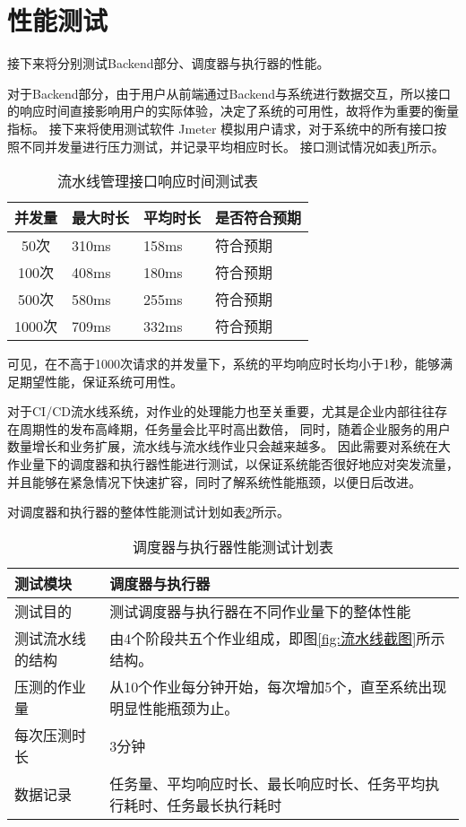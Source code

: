 \section{性能测试}
接下来将分别测试Backend部分、调度器与执行器的性能。

对于Backend部分，由于用户从前端通过Backend与系统进行数据交互，所以接口的响应时间直接影响用户的实际体验，决定了系统的可用性，故将作为重要的衡量指标。
接下来将使用测试软件 Jmeter 模拟用户请求，对于系统中的所有接口按照不同并发量进行压力测试，并记录平均相应时长。
接口测试情况如表\ref{tab:流水线管理接口响应时间测试表}所示。

\begin{table}[h]
  \centering
  \caption{流水线管理接口响应时间测试表}
  \label{tab:流水线管理接口响应时间测试表}
  \begin{tabular}{clll}
    \toprule
    并发量         & 最大时长            & 平均时长     & 是否符合预期                       \\
    \midrule
    50次         & 310ms              & 158ms     & 符合预期                 \\
    100次        & 408ms              & 180ms     & 符合预期                 \\
    500次        & 580ms              & 255ms     & 符合预期                     \\
    1000次       & 709ms              & 332ms     & 符合预期                     \\
    \bottomrule
  \end{tabular}
\end{table}

可见，在不高于1000次请求的并发量下，系统的平均响应时长均小于1秒，能够满足期望性能，保证系统可用性。

对于CI/CD流水线系统，对作业的处理能力也至关重要，尤其是企业内部往往存在周期性的发布高峰期，任务量会比平时高出数倍，
同时，随着企业服务的用户数量增长和业务扩展，流水线与流水线作业只会越来越多。
因此需要对系统在大作业量下的调度器和执行器性能进行测试，以保证系统能否很好地应对突发流量，并且能够在紧急情况下快速扩容，同时了解系统性能瓶颈，以便日后改进。

对调度器和执行器的整体性能测试计划如表\ref{tab:调度器与执行器性能测试计划表}所示。

\begin{table}[ht]
  \centering
  \caption{调度器与执行器性能测试计划表}
  \label{tab:调度器与执行器性能测试计划表}
  \renewcommand{\arraystretch}{1.5}
  \begin{tabular}{|p{3cm}|p{10cm}|}
  \hline
  测试模块 & 调度器与执行器 \\ \hline
  测试目的 & 测试调度器与执行器在不同作业量下的整体性能 \\ \hline
  测试流水线的结构 & 由4个阶段共五个作业组成，即图\ref{fig:流水线截图}所示结构。\\ \hline
  压测的作业量 & 从10个作业每分钟开始，每次增加5个，直至系统出现明显性能瓶颈为止。\\ \hline
  每次压测时长 & 3分钟\\ \hline
  数据记录 & 任务量、平均响应时长、最长响应时长、任务平均执行耗时、任务最长执行耗时\\ \hline
  \end{tabular}
\end{table}

